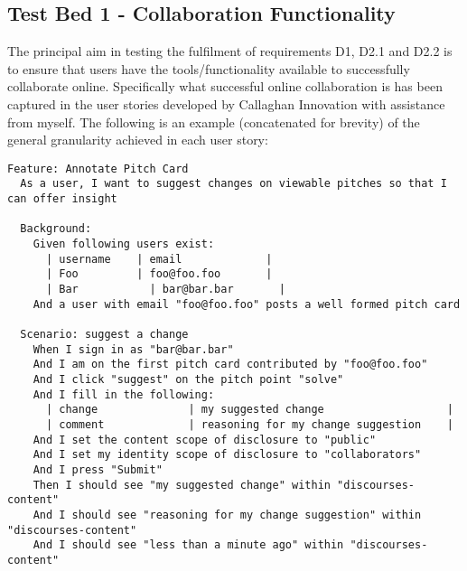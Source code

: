 \subsection{Test Bed 1 - Collaboration Functionality}\label{SS:collaborativeFunctionality}
The principal aim in testing the fulfilment of requirements D1, D2.1 and D2.2 is to ensure that users have the tools/functionality available to successfully collaborate online. Specifically what successful online collaboration is has been captured in the user stories developed by Callaghan Innovation with assistance from myself. The following is an example (concatenated for brevity) of the general granularity achieved in each user story:

\begin{verbatim}
Feature: Annotate Pitch Card
  As a user, I want to suggest changes on viewable pitches so that I can offer insight

  Background:
    Given following users exist:
      | username    | email             |
      | Foo	        | foo@foo.foo       |
      | Bar      	  | bar@bar.bar       |
    And a user with email "foo@foo.foo" posts a well formed pitch card

  Scenario: suggest a change
    When I sign in as "bar@bar.bar"
    And I am on the first pitch card contributed by "foo@foo.foo"
    And I click "suggest" on the pitch point "solve"
    And I fill in the following:
      | change              | my suggested change                   |
      | comment             | reasoning for my change suggestion    |
    And I set the content scope of disclosure to "public"
    And I set my identity scope of disclosure to "collaborators"
    And I press "Submit"
    Then I should see "my suggested change" within "discourses-content"
    And I should see "reasoning for my change suggestion" within "discourses-content"
    And I should see "less than a minute ago" within "discourses-content"

\end{verbatim}

